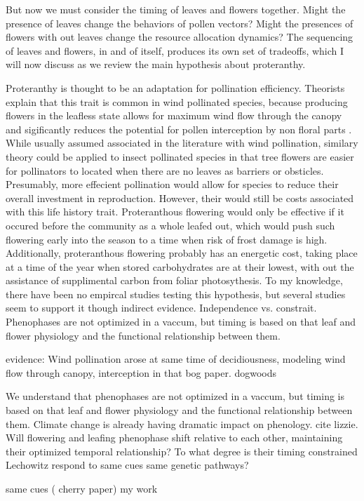 \documentclass{article}\usepackage[]{graphicx}\usepackage[]{color}
\begin{document}
But now we must consider the timing of leaves and flowers together. Might the presence of leaves change the behaviors of pollen vectors? Might the presences of flowers with out leaves change the resource allocation dynamics? The sequencing of leaves and flowers, in and of itself, produces its own set of tradeoffs, which I will now discuss as we review the main hypothesis about proteranthy.
\par Proteranthy is thought to be an adaptation for pollination efficiency. Theorists explain that this trait is common in wind pollinated species, because producing flowers in the leafless state allows for maximum wind flow through the canopy and sigificantly reduces the potential for pollen interception by non floral parts \citep{}. While usually assumed associated in the literature with wind pollination, similary theory could be applied to insect pollinated species in that tree flowers are easier for pollinators to located when there are no leaves as barriers or obsticles.  Presumably, more effecient pollination would allow for species to reduce their overall investment in reproduction. However, their would still be costs associated with this life history trait. Proteranthous flowering would only be effective if it occured before the community as a whole leafed out, which would push such flowering early into the season to a time when risk of frost damage is high. Additionally, proteranthous flowering probably has an energetic cost, taking place at a time of the year when stored carbohydrates are at their lowest, with out the assistance of supplimental carbon from foliar photosythesis\citep{}. To my knowledge, there have been no empircal studies testing this hypothesis, but several studies seem to support it though indirect evidence.
Independence vs. constrait.
Phenophases are not optimized in a vaccum, but timing is based on that leaf and flower physiology and the functional relationship between them.

evidence: Wind pollination arose at same time of decidiousness, modeling wind flow through canopy, interception in that bog paper. dogwoods

\par We understand that phenophases are not optimized in a vaccum, but timing is based on that leaf and flower physiology and the functional relationship between them. Climate change is already having dramatic impact on phenology. cite lizzie. Will flowering and leafing phenophase shift relative to each other, maintaining their optimized temporal relationship?
To what degree is their timing constrained
Lechowitz
respond to same cues
same genetic pathways?

same cues ( cherry paper)
my work
\end{document}
